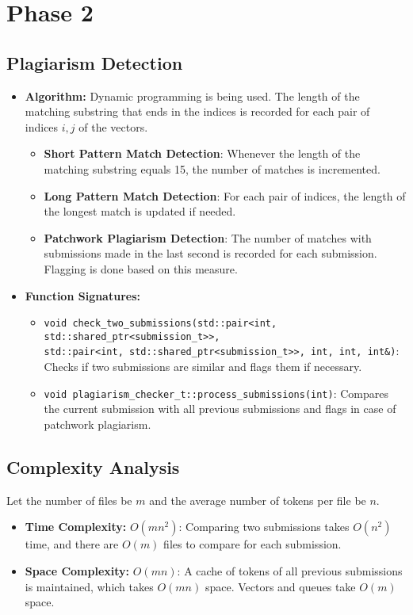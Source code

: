 \documentclass[11pt]{article}
\let\oldtexttt\texttt
\def\texttt#1{{\color{RoyalBlue}\oldtexttt{#1}}}
\begin{document}
\section{Phase 2}
\vspace{-5pt}
\subsection{Plagiarism Detection}
\begin{itemize}[noitemsep]
    \item \textbf{Algorithm:} Dynamic programming is being used. The length of the matching substring that ends in the indices is recorded for each pair of indices $i, j$ of the vectors.
    \begin{itemize}
        \item \textbf{Short Pattern Match Detection}: Whenever the length of the matching substring equals 15, the number of matches is incremented.
        \item \textbf{Long Pattern Match Detection}: For each pair of indices, the length of the longest match is updated if needed.
        \item \textbf{Patchwork Plagiarism Detection}: The number of matches with submissions made in the last second is recorded for each submission. Flagging is done based on this measure.
    \end{itemize}
    \item \textbf{Function Signatures:}
    \begin{itemize}
        \item \texttt{void check\_two\_submissions(std::pair<int, std::shared\_ptr<submission\_t>>, \\ std::pair<int, std::shared\_ptr<submission\_t>>, int, int, int\&)}:
        Checks if two submissions are similar and flags them if necessary.
        \item \texttt{void plagiarism\_checker\_t::process\_submissions(int)}:
        Compares the current submission with all previous submissions and flags in case of patchwork plagiarism.
    \end{itemize}
\end{itemize}
\vspace{-5pt}
\subsection{Complexity Analysis}
Let the number of files be $m$ and the average number of tokens per file be $n$.
\begin{itemize}[noitemsep]
    \item \textbf{Time Complexity:} $O(mn^2)$: Comparing two submissions takes $O(n^2)$ time, and there are $O(m)$ files to compare for each submission.
    \item \textbf{Space Complexity:} $O(mn)$: A cache of tokens of all previous submissions is maintained, which takes $O(mn)$ space. Vectors and queues take $O(m)$ space.
\end{itemize}
\vspace{-5pt}
\end{document}
